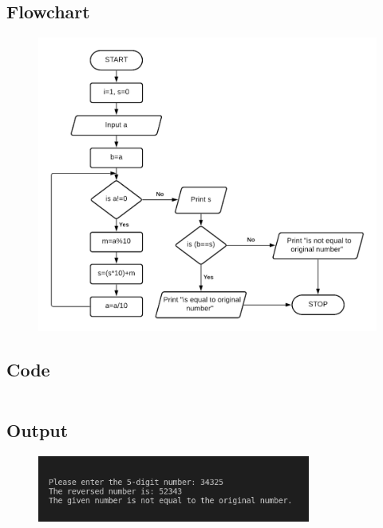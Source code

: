 \documentclass[12pt]{article}
\begin{document}
\subsection{Flowchart}
\begin{figure}[h]
    \centering
    \includegraphics[width=1.0\textwidth]{Flowchart10.png}
\end{figure}
\newpage
\subsection{Code}
\inputminted{c}{q10.c}
\subsection{Output}
\begin{figure}[h]
    \centering
    \includegraphics[width=0.8\textwidth]{10.png}
\end{figure}
\newpage
\end{document}
